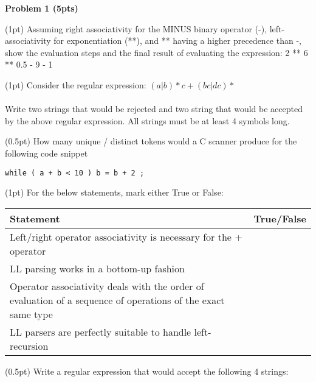 
\vspace{1cm}

\noindent
{\bf Problem 1 (5pts)}
\vspace{1cm}


\noindent
(1pt) Assuming right associativity for the MINUS binary operator (-), left-associativity for exponentiation (**),
and ** having a higher precedence than -,
show the evaluation steps and the final result of evaluating the expression: 2 ** 6 ** 0.5 - 9 - 1

\vspace{1in}

\noindent
(1pt) Consider the regular expression: $(a|b) * c+ (bc | dc)*$ \\
\\
  Write two strings that would be rejected and two string that would be accepted by the above regular expression.
  All strings must be at least 4 symbols long.


\vspace{1in}

\noindent
(0.5pt)  How many unique / distinct tokens would a C scanner produce for the following code snippet

\begin{lstlisting}
while ( a + b < 10 ) b = b + 2 ;
\end{lstlisting}

\vspace{1in}

\pagebreak
\noindent
(1pt) For the below statements, mark either True or False:

\vspace{1cm}

\begin{tabular}{|p{13cm}|p{2cm}|}
\hline
{\bf Statement} & {\bf True/False} \\
\hline
Left/right operator associativity is necessary for the + operator &  \\
\hline
LL parsing works in a bottom-up fashion  &   \\
\hline
Operator associativity deals with the order of evaluation of a sequence of operations of the exact same type	 &  \\
\hline
LL parsers are perfectly suitable to handle left-recursion &  \\
\hline
\end{tabular}

\vspace{1cm}

\noindent
(0.5pt) Write a regular expression that would accept the following 4 strings:

